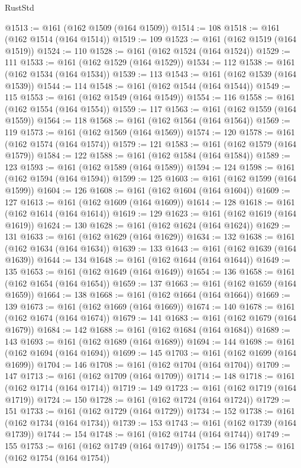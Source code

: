 \begin{lexlean}{RustStd}
\begin{coremodule}
{\begin{coremodule}
{{{{{{{{{{{{{{{{{{{{{{{{{{{{{{{{{{{{{{{{{{{{{{{{{{{{{{{{{{{{@1513 := @161 (@162 @1509 (@164 @1509))
@1514 := 108
@1518 := @161 (@162 @1514 (@164 @1514))
@1519 := 109
@1523 := @161 (@162 @1519 (@164 @1519))
@1524 := 110
@1528 := @161 (@162 @1524 (@164 @1524))
@1529 := 111
@1533 := @161 (@162 @1529 (@164 @1529))
@1534 := 112
@1538 := @161 (@162 @1534 (@164 @1534))
@1539 := 113
@1543 := @161 (@162 @1539 (@164 @1539))
@1544 := 114
@1548 := @161 (@162 @1544 (@164 @1544))
@1549 := 115
@1553 := @161 (@162 @1549 (@164 @1549))
@1554 := 116
@1558 := @161 (@162 @1554 (@164 @1554))
@1559 := 117
@1563 := @161 (@162 @1559 (@164 @1559))
@1564 := 118
@1568 := @161 (@162 @1564 (@164 @1564))
@1569 := 119
@1573 := @161 (@162 @1569 (@164 @1569))
@1574 := 120
@1578 := @161 (@162 @1574 (@164 @1574))
@1579 := 121
@1583 := @161 (@162 @1579 (@164 @1579))
@1584 := 122
@1588 := @161 (@162 @1584 (@164 @1584))
@1589 := 123
@1593 := @161 (@162 @1589 (@164 @1589))
@1594 := 124
@1598 := @161 (@162 @1594 (@164 @1594))
@1599 := 125
@1603 := @161 (@162 @1599 (@164 @1599))
@1604 := 126
@1608 := @161 (@162 @1604 (@164 @1604))
@1609 := 127
@1613 := @161 (@162 @1609 (@164 @1609))
@1614 := 128
@1618 := @161 (@162 @1614 (@164 @1614))
@1619 := 129
@1623 := @161 (@162 @1619 (@164 @1619))
@1624 := 130
@1628 := @161 (@162 @1624 (@164 @1624))
@1629 := 131
@1633 := @161 (@162 @1629 (@164 @1629))
@1634 := 132
@1638 := @161 (@162 @1634 (@164 @1634))
@1639 := 133
@1643 := @161 (@162 @1639 (@164 @1639))
@1644 := 134
@1648 := @161 (@162 @1644 (@164 @1644))
@1649 := 135
@1653 := @161 (@162 @1649 (@164 @1649))
@1654 := 136
@1658 := @161 (@162 @1654 (@164 @1654))
@1659 := 137
@1663 := @161 (@162 @1659 (@164 @1659))
@1664 := 138
@1668 := @161 (@162 @1664 (@164 @1664))
@1669 := 139
@1673 := @161 (@162 @1669 (@164 @1669))
@1674 := 140
@1678 := @161 (@162 @1674 (@164 @1674))
@1679 := 141
@1683 := @161 (@162 @1679 (@164 @1679))
@1684 := 142
@1688 := @161 (@162 @1684 (@164 @1684))
@1689 := 143
@1693 := @161 (@162 @1689 (@164 @1689))
@1694 := 144
@1698 := @161 (@162 @1694 (@164 @1694))
@1699 := 145
@1703 := @161 (@162 @1699 (@164 @1699))
@1704 := 146
@1708 := @161 (@162 @1704 (@164 @1704))
@1709 := 147
@1713 := @161 (@162 @1709 (@164 @1709))
@1714 := 148
@1718 := @161 (@162 @1714 (@164 @1714))
@1719 := 149
@1723 := @161 (@162 @1719 (@164 @1719))
@1724 := 150
@1728 := @161 (@162 @1724 (@164 @1724))
@1729 := 151
@1733 := @161 (@162 @1729 (@164 @1729))
@1734 := 152
@1738 := @161 (@162 @1734 (@164 @1734))
@1739 := 153
@1743 := @161 (@162 @1739 (@164 @1739))
@1744 := 154
@1748 := @161 (@162 @1744 (@164 @1744))
@1749 := 155
@1753 := @161 (@162 @1749 (@164 @1749))
@1754 := 156
@1758 := @161 (@162 @1754 (@164 @1754))
}}}}}}}}}}}}}}}}}}}}}}}}}}}}}}}}}}}}}}}}}}}}}}}}}}}}}}}}}}}}
\end{coremodule}}
\end{coremodule}
\end{lexlean}
